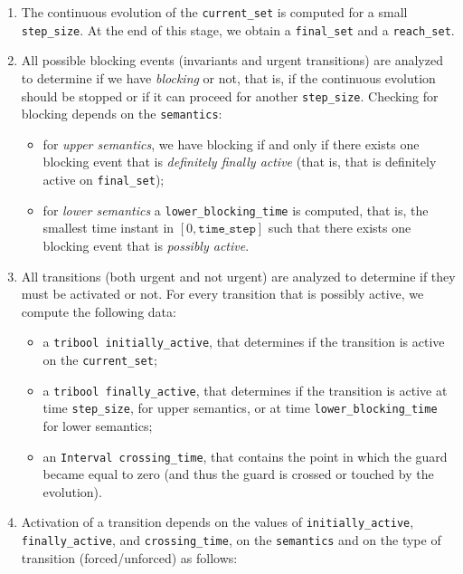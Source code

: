 \documentclass[english,a4paper]{article}
\theoremstyle{theorem}
\theoremstyle{definition}
\theoremstyle{remark}
\begin{document}
\begin{enumerate}
	\item The continuous evolution of the \texttt{current\_set} is computed for a small \texttt{step\_size}. At the end of this stage, we obtain a \texttt{final\_set} and a \texttt{reach\_set}.

	\item All possible blocking events (invariants and urgent transitions) are analyzed to determine if we have \emph{blocking} or not, that is, if the continuous evolution should be stopped or if it can proceed for another \texttt{step\_size}. Checking for blocking depends on the \texttt{semantics}:
		\begin{itemize}
			\item for \emph{upper semantics}, we have blocking if and only if there exists one blocking event that is \emph{definitely finally active} (that is, that is definitely active on \texttt{final\_set});
			\item for \emph{lower semantics} a \texttt{lower\_blocking\_time} is computed, that is, the smallest time instant in $[0, \mathtt{time\_step}]$ such that there exists one blocking event that is \emph{possibly active}.
	\end{itemize}

	\item All transitions (both urgent and not urgent) are analyzed to determine if they must be activated or not. For every transition that is possibly active, we compute the following data:
		\begin{itemize}
			\item a \texttt{tribool initially\_active}, that determines if the transition is active on the \texttt{current\_set};
			\item a \texttt{tribool finally\_active}, that determines if the transition is active at time \texttt{step\_size}, for upper semantics, or at time \texttt{lower\_blocking\_time} for lower semantics;
			\item an \texttt{Interval crossing\_time}, that contains the point in which the guard became equal to zero (and thus the guard is crossed or touched by the evolution).
			\end{itemize}

	\item Activation of a transition depends on the values of \texttt{initially\_active}, \texttt{finally\_active}, and \texttt{crossing\_time}, on the \texttt{semantics} and on the type of transition (forced/unforced) as follows:


\end{enumerate}
\end{document}
